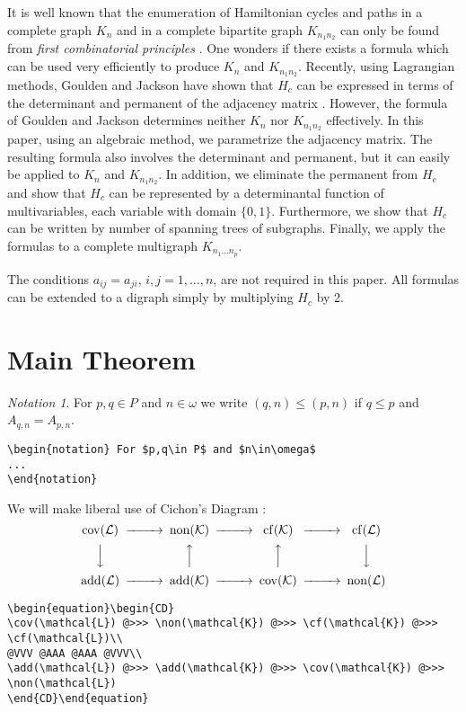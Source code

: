 \documentclass[draft]{amsart}
\theoremstyle{definition}
\theoremstyle{remark}
\newtheorem{notation}{Notation}
\newcommand{\cov}{\operatorname{cov}}
\newcommand{\non}{\operatorname{non}}
\newcommand{\cf}{\operatorname{cf}}
\newcommand{\add}{\operatorname{add}}
\begin{document}
It is well known that the enumeration of Hamiltonian cycles and paths in a
complete graph $K_n$ and in a complete bipartite graph $K_{n_1n_2}$
can only be found from \textit{first combinatorial principles}
\cite{hapa:graphenum}. One wonders
if there exists a formula which can be used very efficiently to produce
$K_n$ and $K_{n_1n_2}$. Recently, using Lagrangian methods, Goulden and
Jackson have shown that $H_c$ can be expressed in terms of the determinant
and permanent of the adjacency matrix \cite{gouja:lagrmeth}.
However, the formula of Goulden
and Jackson determines neither $K_n$ nor $K_{n_1n_2}$ effectively. In this
paper, using an algebraic method, we parametrize the adjacency matrix. The
resulting formula also involves the determinant and permanent, but it can
easily be applied to $K_n$ and $K_{n_1n_2}$. In addition, we eliminate the
permanent from $H_c$ and show that $H_c$ can be represented by a
determinantal function of multivariables, each variable with domain $\{0,1\}$.
Furthermore, we show that $H_c$ can be written by number of spanning trees
of subgraphs. Finally, we apply the formulas to a complete multigraph
$K_{n_1\dots n_p}$.

The conditions $a_{ij}=a_{ji}$, $i,j=1,\dots,n$, are not required in this
paper. All formulas can be extended to a digraph simply by multiplying
$H_c$ by 2.

\section{Main Theorem}
\label{s:mt}

\begin{notation} For $p,q\in P$ and $n\in\omega$ we write
$(q,n)\le(p,n)$ if $q\le p$ and $A_{q,n}=A_{p,n}$.
\begin{verbatim}
\begin{notation} For $p,q\in P$ and $n\in\omega$
...
\end{notation}
\end{verbatim}

We will make liberal use of Cichon's Diagram \cite{fre:cichon}:
\begin{equation}
\begin{CD}
\cov(\mathcal{L}) @>>> \non(\mathcal{K}) @>>> \cf(\mathcal{K}) @>>>
\cf(\mathcal{L})\\
@VVV @AAA @AAA @VVV\\
\add(\mathcal{L}) @>>> \add(\mathcal{K}) @>>> \cov(\mathcal{K}) @>>>
\non(\mathcal{L})
\end{CD}\end{equation}
%
\begin{verbatim}
\begin{equation}\begin{CD}
\cov(\mathcal{L}) @>>> \non(\mathcal{K}) @>>> \cf(\mathcal{K}) @>>>
\cf(\mathcal{L})\\
@VVV @AAA @AAA @VVV\\
\add(\mathcal{L}) @>>> \add(\mathcal{K}) @>>> \cov(\mathcal{K}) @>>>
\non(\mathcal{L})
\end{CD}\end{equation}
\end{verbatim}
\end{notation}
\end{document}
